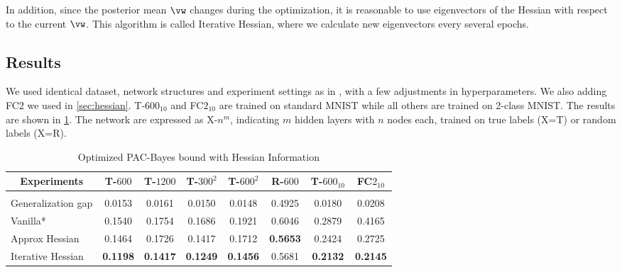 In addition, since the posterior mean $\vw$ changes during the optimization, it is reasonable to use eigenvectors of the Hessian with respect to the current $\vw$. This algorithm is called Iterative Hessian, where we calculate new eigenvectors every several epochs.

\subsection{Results}
We used identical dataset, network structures and experiment settings as in \citet{dziugaite2017computing}, with a few adjustments in hyperparameters. We also adding FC2 we used in \cref{sec:hessian}. T-$600_{10}$ and FC$2_{10}$ are trained on standard MNIST while all others are trained on 2-class MNIST. The results are shown in \cref{tab:pac}. The network are expressed as X-$n^m$, indicating $m$ hidden layers with $n$ nodes each, trained on true labels (X=T) or random labels (X=R).

\begin{table}[th]
\caption{Optimized PAC-Bayes bound with Hessian Information }

\begin{center}
\begin{tabular}{lccccccc}
\multicolumn{1}{c}{\bf Experiments}  & T-$600$ & T-$1200$ & T-$300^2$ & T-$600^2$ & R-$600$ & T-$600_{10}$ & FC$2_{10}$
\\ \hline \\
Generalization gap      & 0.0153  & 0.0161  & 0.0150 & 0.0148  & 0.4925 & 0.0180 & 0.0208 \\
Vanilla*                 & 0.1540  & 0.1754 &  0.1686 & 0.1921  & 0.6046  & 0.2879 & 0.4165 \\
Approx Hessian          & 0.1464 & 0.1726  & 0.1417  & 0.1712  & \textbf{0.5653} & 0.2424 & 0.2725 \\
Iterative Hessian       &  \textbf{0.1198}  & \textbf{0.1417}  & \textbf{0.1249}  & \textbf{0.1456}  & 0.5681 & \textbf{0.2132}   & \textbf{0.2145}  \\
\end{tabular}
\end{center}
\label{tab:pac}
\end{table}


